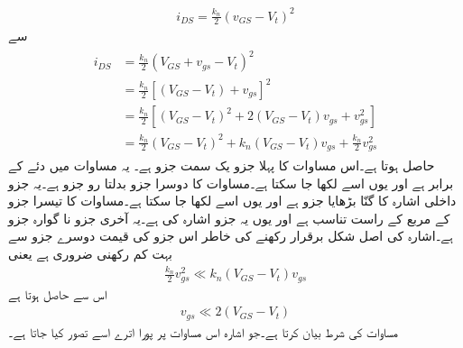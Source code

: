\begin{align}\label{شناخت_مساوات_ماسفیٹ_خط_کی_مساوات_بدلتی_رو}
i_{DS}=\frac{k_n}{2} \left(v_{GS}-V_t \right)^2
\end{align}
سے
\begin{gather} \label{مساوات_میدانی_رو_کے_حصے}
\begin{aligned}
i_{DS}&=\frac{k_n}{2} \left(V_{GS}+v_{gs}-V_t \right )^2\\
&=\frac{k_n}{2}\left[\left(V_{GS}-V_t\right)+v_{gs} \right ]^2\\
&=\frac{k_n}{2} \left[\left(V_{GS}-V_t \right )^2+2 \left(V_{GS}-V_t \right ) v_{gs}+v_{gs}^{2} \right ] \\
&=\frac{k_n}{2} \left(V_{GS}-V_t \right )^2+k_n \left(V_{GS}-V_t \right ) v_{gs}+ \frac{k_n}{2} v_{gs}^{2} 
\end{aligned}
\end{gather}
حاصل ہوتا ہے۔اس مساوات کا پہلا جزو    یک سمت جزو ہے۔ یہ مساوات   میں دئے   کے برابر ہے اور یوں اسے  لکھا جا سکتا ہے۔مساوات کا دوسرا جزو   بدلتا رو جزو ہے۔یہ جزو داخلی اشارہ کا   گنّا بڑھایا جزو ہے اور یوں اسے   لکھا جا سکتا ہے۔مساوات کا تیسرا جزو  کے مربع کے راست تناسب ہے اور یوں یہ جزو اشارہ کی   ہے۔یہ آخری جزو   نا گوارہ جزو ہے۔اشارہ کی اصل شکل برقرار رکھنے کی خاطر اس جزو کی قیمت دوسرے جزو سے بہت کم رکھنی ضروری ہے یعنی
\begin{align*}
\frac{k_n}{2}v_{gs}^2 \ll k_n \left(V_{GS}-V_t \right )v_{gs}
\end{align*}
اس سے حاصل ہوتا ہے
\begin{align} \label{مساوات_میدانی_باریک_اشارہ_کی_شرط}
v_{gs} \ll 2 \left(V_{GS}-V_t \right )
\end{align}
مساوات      کی شرط بیان کرتا ہے۔جو اشارہ اس مساوات پر پورا اترے اسے  تصور کیا جاتا ہے۔

